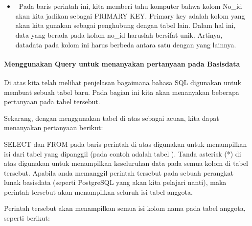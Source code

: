 \documentclass[letterpaper,10pt,english]{sphinxmanual}
\begin{document}
 

\begin{sphinxVerbatim}[commandchars=\\\{\}]
  
\end{sphinxVerbatim}

 
\begin{itemize}
\item {} 
  Pada baris perintah ini, kita memberi tahu komputer bahwa kolom No\_id akan kita jadikan sebagai PRIMARY KEY. Primary key adalah kolom yang akan kita gunakan sebagai penghubung dengan tabel lain. Dalam hal ini, data yang berada pada kolom no\_id haruslah bersifat unik. Artinya, data\sphinxhyphen{}data pada kolom ini harus berbeda antara satu dengan yang lainnya.

\end{itemize}


\paragraph{Menggunakan Query untuk menanyakan pertanyaan pada Basisdata}
\label{\detokenize{sesi2/relationaldb:menggunakan-query-untuk-menanyakan-pertanyaan-pada-basisdata}}
Di atas kita telah melihat penjelasan bagaimana bahasa SQL digunakan untuk membuat sebuah tabel baru. Pada bagian ini kita akan menanyakan beberapa pertanyaan pada tabel tersebut.

Sekarang, dengan menggunakan tabel  di atas sebagai acuan, kita dapat menanyakan pertanyaan berikut:

\begin{sphinxVerbatim}[commandchars=\\\{\}]
   
\end{sphinxVerbatim}

SELECT dan FROM pada baris perintah di atas digunakan untuk menampilkan isi dari tabel yang dipanggil (pada contoh adalah tabel ). Tanda asterisk (*) di atas digunakan untuk menampilkan keseluruhan data pada semua kolom di tabel tersebut. Apabila anda memanggil perintah tersebut pada sebuah perangkat lunak basisdata (seperti PostgreSQL yang akan kita pelajari nanti), maka perintah tersebut akan menampilkan seluruh isi tabel anggota.

Perintah tersebut akan menampilkan semua isi kolom nama pada tabel anggota, seperti berikut:
\end{document}
